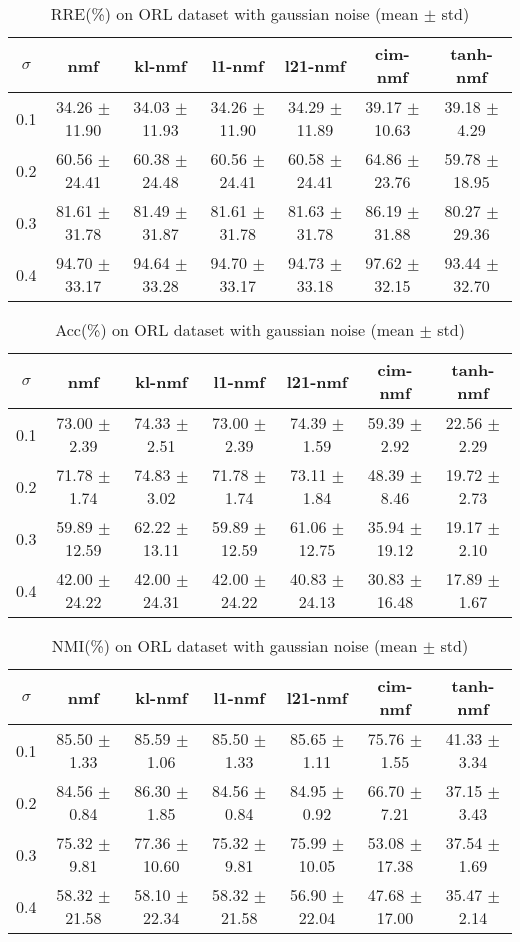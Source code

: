 \documentclass{article} %
\begin{document}
\begin{table}[H]
\begin{tabular}{c|cccccc}$\sigma$ & nmf & kl-nmf & l1-nmf & l21-nmf & cim-nmf & tanh-nmf \\\hline
0.1 & 34.26 $\pm$ 11.90 & 34.03 $\pm$ 11.93 & 34.26 $\pm$ 11.90 & 34.29 $\pm$ 11.89 & 39.17 $\pm$ 10.63 & 39.18 $\pm$ 4.29 \\
0.2 & 60.56 $\pm$ 24.41 & 60.38 $\pm$ 24.48 & 60.56 $\pm$ 24.41 & 60.58 $\pm$ 24.41 & 64.86 $\pm$ 23.76 & 59.78 $\pm$ 18.95 \\
0.3 & 81.61 $\pm$ 31.78 & 81.49 $\pm$ 31.87 & 81.61 $\pm$ 31.78 & 81.63 $\pm$ 31.78 & 86.19 $\pm$ 31.88 & 80.27 $\pm$ 29.36 \\
0.4 & 94.70 $\pm$ 33.17 & 94.64 $\pm$ 33.28 & 94.70 $\pm$ 33.17 & 94.73 $\pm$ 33.18 & 97.62 $\pm$ 32.15 & 93.44 $\pm$ 32.70 \\
\end{tabular}\caption{
  RRE(\%) on ORL dataset with gaussian noise (mean $\pm$ std)
  \label{tab:RRE-ORL-gaussian}
}\end{table}
\begin{table}[H]
\begin{tabular}{c|cccccc}$\sigma$ & nmf & kl-nmf & l1-nmf & l21-nmf & cim-nmf & tanh-nmf \\\hline
0.1 & 73.00 $\pm$ 2.39 & 74.33 $\pm$ 2.51 & 73.00 $\pm$ 2.39 & 74.39 $\pm$ 1.59 & 59.39 $\pm$ 2.92 & 22.56 $\pm$ 2.29 \\
0.2 & 71.78 $\pm$ 1.74 & 74.83 $\pm$ 3.02 & 71.78 $\pm$ 1.74 & 73.11 $\pm$ 1.84 & 48.39 $\pm$ 8.46 & 19.72 $\pm$ 2.73 \\
0.3 & 59.89 $\pm$ 12.59 & 62.22 $\pm$ 13.11 & 59.89 $\pm$ 12.59 & 61.06 $\pm$ 12.75 & 35.94 $\pm$ 19.12 & 19.17 $\pm$ 2.10 \\
0.4 & 42.00 $\pm$ 24.22 & 42.00 $\pm$ 24.31 & 42.00 $\pm$ 24.22 & 40.83 $\pm$ 24.13 & 30.83 $\pm$ 16.48 & 17.89 $\pm$ 1.67 \\
\end{tabular}\caption{
  Acc(\%) on ORL dataset with gaussian noise (mean $\pm$ std)
  \label{tab:Acc-ORL-gaussian}
}\end{table}
\begin{table}[H]
\begin{tabular}{c|cccccc}$\sigma$ & nmf & kl-nmf & l1-nmf & l21-nmf & cim-nmf & tanh-nmf \\\hline
0.1 & 85.50 $\pm$ 1.33 & 85.59 $\pm$ 1.06 & 85.50 $\pm$ 1.33 & 85.65 $\pm$ 1.11 & 75.76 $\pm$ 1.55 & 41.33 $\pm$ 3.34 \\
0.2 & 84.56 $\pm$ 0.84 & 86.30 $\pm$ 1.85 & 84.56 $\pm$ 0.84 & 84.95 $\pm$ 0.92 & 66.70 $\pm$ 7.21 & 37.15 $\pm$ 3.43 \\
0.3 & 75.32 $\pm$ 9.81 & 77.36 $\pm$ 10.60 & 75.32 $\pm$ 9.81 & 75.99 $\pm$ 10.05 & 53.08 $\pm$ 17.38 & 37.54 $\pm$ 1.69 \\
0.4 & 58.32 $\pm$ 21.58 & 58.10 $\pm$ 22.34 & 58.32 $\pm$ 21.58 & 56.90 $\pm$ 22.04 & 47.68 $\pm$ 17.00 & 35.47 $\pm$ 2.14 \\
\end{tabular}\caption{
  NMI(\%) on ORL dataset with gaussian noise (mean $\pm$ std)
  \label{tab:NMI-ORL-gaussian}
}\end{table}
\end{document}
